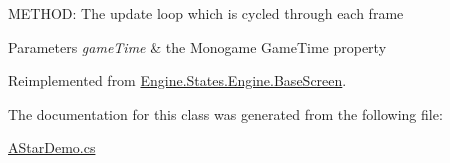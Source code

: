 M\+E\+T\+H\+OD\+: The update loop which is cycled through each frame 


\begin{DoxyParams}{Parameters}
{\em game\+Time} & the Monogame Game\+Time property\\
\hline
\end{DoxyParams}


Reimplemented from \hyperlink{a00550_a098ece7d1e112475f6e880c3a672af64}{Engine.\+States.\+Engine.\+Base\+Screen}.



The documentation for this class was generated from the following file\+:\begin{DoxyCompactItemize}
\item 
\hyperlink{a00203}{A\+Star\+Demo.\+cs}\end{DoxyCompactItemize}
